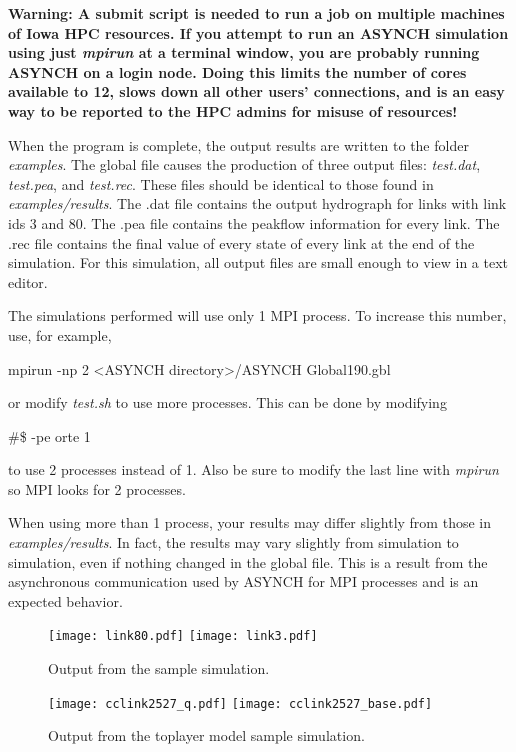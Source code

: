\documentclass[12pt]{article}
\newenvironment{codeindent}
{\begin{list}{}
        {\setlength{\leftmargin}{.1in}}
        \item[]
}
{\end{list}}
\begin{document}
\textbf{Warning: A submit script is needed to run a job on multiple machines of Iowa HPC resources. If you attempt to run an ASYNCH simulation using just \emph{mpirun} at a terminal window, you are probably running ASYNCH on a login node. Doing this limits the number of cores available to 12, slows down all other users' connections, and is an easy way to be reported to the HPC admins for misuse of resources!}

When the program is complete, the output results are written to the folder \emph{examples}. The global file causes the production of three output files: \emph{test.dat}, \emph{test.pea}, and \emph{test.rec}. These files should be identical to those found in \emph{examples/results}. The .dat file contains the output hydrograph for links with link ids 3 and 80. The .pea file contains the peakflow information for every link. The .rec file contains the final value of every state of every link at the end of the simulation. For this simulation, all output files are small enough to view in a text editor.

The simulations performed will use only 1 MPI process. To increase this number, use, for example,
\begin{codeindent}
 mpirun -np 2 <ASYNCH directory>/ASYNCH Global190.gbl
\end{codeindent}
or modify \emph{test.sh} to use more processes. This can be done by modifying
\begin{codeindent}
 \#\$ -pe orte 1
\end{codeindent}
to use 2 processes instead of 1. Also be sure to modify the last line with \emph{mpirun} so MPI looks for 2 processes.

When using more than 1 process, your results may differ slightly from those in \emph{examples/results}. In fact, the results may vary slightly from simulation to simulation, even if nothing changed in the global file. This is a result from the asynchronous communication used by ASYNCH for MPI processes and is an expected behavior.

\begin{figure}[ht]
\centering
\texttt{[image: link80.pdf]}
\texttt{[image: link3.pdf]}
\caption{Output from the sample simulation.}
\label{fig: sample hydrographs}
\end{figure}

\begin{figure}[ht]
\centering
\texttt{[image: cclink2527\_q.pdf]}
\texttt{[image: cclink2527\_base.pdf]}
\caption{Output from the toplayer model sample simulation.}
\label{fig: sample hydrographs cc}
\end{figure}
\end{document}
